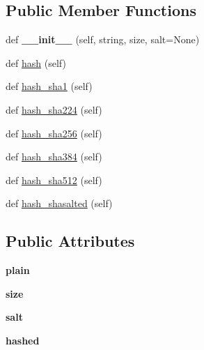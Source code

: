 \subsection*{Public Member Functions}
\begin{DoxyCompactItemize}
\item 
def {\bfseries \+\_\+\+\_\+init\+\_\+\+\_\+} (self, string, size, salt=None)\hypertarget{classhal_1_1maths_1_1crypt_1_1_s_h_a_accde1fc65395f7ecd7869fa7a71961f1}{}\label{classhal_1_1maths_1_1crypt_1_1_s_h_a_accde1fc65395f7ecd7869fa7a71961f1}

\item 
def \hyperlink{classhal_1_1maths_1_1crypt_1_1_s_h_a_a4434870473a585d5382945a8cef6c7c3}{hash} (self)
\item 
def \hyperlink{classhal_1_1maths_1_1crypt_1_1_s_h_a_a87af3f937c0cfed513ea0720c4814246}{hash\+\_\+sha1} (self)
\item 
def \hyperlink{classhal_1_1maths_1_1crypt_1_1_s_h_a_ad258fade71cc488adc9e5cbcfaf7fc9c}{hash\+\_\+sha224} (self)
\item 
def \hyperlink{classhal_1_1maths_1_1crypt_1_1_s_h_a_aa2c42ae578cf76dc73cfd443fc931605}{hash\+\_\+sha256} (self)
\item 
def \hyperlink{classhal_1_1maths_1_1crypt_1_1_s_h_a_af0a05dbeeb0ec1f6530aa8c99937b44f}{hash\+\_\+sha384} (self)
\item 
def \hyperlink{classhal_1_1maths_1_1crypt_1_1_s_h_a_ad799ad40338287efb2a6f539954d35e9}{hash\+\_\+sha512} (self)
\item 
def \hyperlink{classhal_1_1maths_1_1crypt_1_1_s_h_a_a9ebefcb7012b2b306cd6b70feb646d8c}{hash\+\_\+shasalted} (self)
\end{DoxyCompactItemize}
\subsection*{Public Attributes}
\begin{DoxyCompactItemize}
\item 
{\bfseries plain}\hypertarget{classhal_1_1maths_1_1crypt_1_1_s_h_a_ad683af29f5abcb0607b3152750ed2848}{}\label{classhal_1_1maths_1_1crypt_1_1_s_h_a_ad683af29f5abcb0607b3152750ed2848}

\item 
{\bfseries size}\hypertarget{classhal_1_1maths_1_1crypt_1_1_s_h_a_a039dcc420e588091d5bf74037882ec31}{}\label{classhal_1_1maths_1_1crypt_1_1_s_h_a_a039dcc420e588091d5bf74037882ec31}

\item 
{\bfseries salt}\hypertarget{classhal_1_1maths_1_1crypt_1_1_s_h_a_ad0916d65406b116f81a23754a3ca3c79}{}\label{classhal_1_1maths_1_1crypt_1_1_s_h_a_ad0916d65406b116f81a23754a3ca3c79}

\item 
{\bfseries hashed}\hypertarget{classhal_1_1maths_1_1crypt_1_1_s_h_a_a633832075c61a928b02a9a9c0fa133eb}{}\label{classhal_1_1maths_1_1crypt_1_1_s_h_a_a633832075c61a928b02a9a9c0fa133eb}

\end{DoxyCompactItemize}
